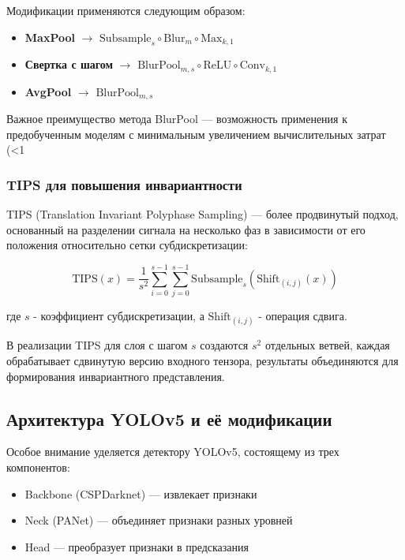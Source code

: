 Модификации применяются следующим образом:
\begin{itemize}
    \item \textbf{MaxPool} $\to$ $\text{Subsample}_{s} \circ \text{Blur}_{m} \circ \text{Max}_{k,1}$
    \item \textbf{Свертка с шагом} $\to$ $\text{BlurPool}_{m,s} \circ \text{ReLU} \circ \text{Conv}_{k,1}$
    \item \textbf{AvgPool} $\to$ $\text{BlurPool}_{m,s}$
\end{itemize}

Важное преимущество метода BlurPool — возможность применения к предобученным моделям с минимальным увеличением вычислительных затрат (<1%

\subsubsection{TIPS для повышения инвариантности}
\label{sec:architectures:tips}

TIPS (Translation Invariant Polyphase Sampling) — более продвинутый подход, основанный на разделении сигнала на несколько фаз в зависимости от его положения относительно сетки субдискретизации:

\begin{equation}
\text{TIPS}(x) = \frac{1}{s^2}\sum_{i=0}^{s-1}\sum_{j=0}^{s-1} \text{Subsample}_{s}(\text{Shift}_{(i,j)}(x))
\end{equation}

где $s$ - коэффициент субдискретизации, а $\text{Shift}_{(i,j)}$ - операция сдвига.

В реализации TIPS для слоя с шагом $s$ создаются $s^2$ отдельных ветвей, каждая обрабатывает сдвинутую версию входного тензора, результаты объединяются для формирования инвариантного представления.

\subsection{Архитектура YOLOv5 и её модификации}
\label{sec:yolov5}

Особое внимание уделяется детектору YOLOv5, состоящему из трех компонентов:
\begin{itemize}
    \item Backbone (CSPDarknet) — извлекает признаки
    \item Neck (PANet) — объединяет признаки разных уровней
    \item Head — преобразует признаки в предсказания
\end{itemize}

